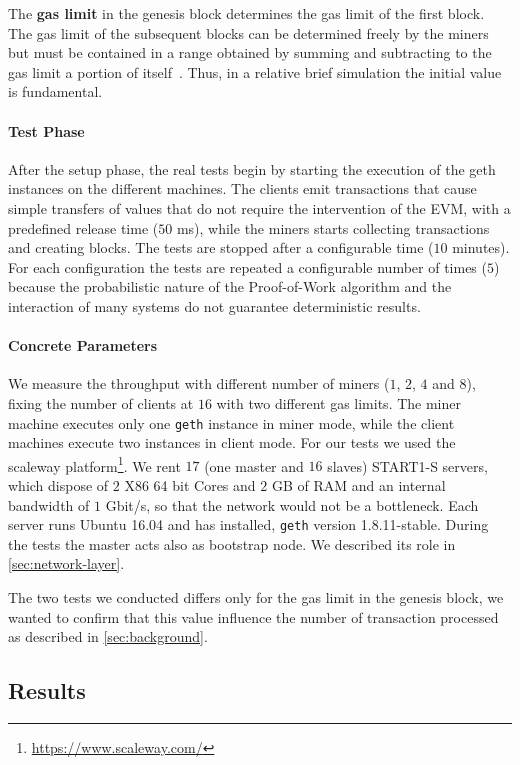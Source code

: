The \textbf{gas limit} in the genesis block determines the gas limit of the
first block. The gas limit of the subsequent blocks can be determined freely by
the miners but must be contained in a range obtained by summing and subtracting
to the gas limit a portion of itself~\cite{wood2018ethereum}. Thus, in a
relative brief simulation the initial value is fundamental.

\paragraph{Test Phase}
After the setup phase, the real tests begin by starting the execution of the 
geth instances on the different machines. The clients emit transactions that
cause simple transfers of values that do not require the intervention of the
EVM, with a predefined release time ($50$ ms), while the miners starts
collecting transactions and creating blocks. The tests are stopped after a 
configurable time ($10$ minutes). For each configuration the tests are repeated 
a configurable number of times ($5$) because the probabilistic nature of the 
Proof-of-Work algorithm and the interaction of many systems do not guarantee 
deterministic results.


\paragraph{Concrete Parameters}
We measure the throughput with different number of miners ($1$, $2$, $4$ and 
$8$), fixing the number of clients at $16$ with two different gas limits. 
The miner machine executes only one \texttt{geth} instance in miner mode, while 
the client machines execute two instances in client mode. For our tests we used 
the scaleway
platform\footnote{\url{https://www.scaleway.com/}}. We rent $17$ (one master
and $16$ slaves) START1-S servers, which dispose of $2$ X86 64 bit Cores and 
$2$ GB of RAM and an internal bandwidth of $1$ Gbit/s, so that the network 
would not be a bottleneck. Each server runs Ubuntu 16.04 and has installed, 
\texttt{geth} version 1.8.11-stable. During the tests the master acts also as 
bootstrap node. We described its role in \autoref{sec:network-layer}. 

The two tests we conducted differs only for the gas limit in the genesis block,
we wanted to confirm that this value influence the number of transaction 
processed as described in \autoref{sec:background}.


\subsection{Results}

